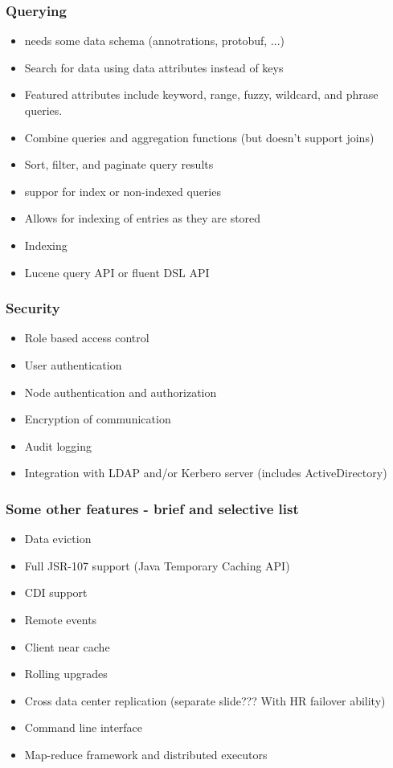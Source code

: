 \documentclass[10pt,utf8]{beamer}
\begin{document}
\begin{frame}
	\frametitle{Querying}
	\begin{itemize}
		\item needs some data schema (annotrations, protobuf, ...)
	 \item Search for data using data attributes instead of keys
	 \item Featured attributes include keyword, range, fuzzy, wildcard, and phrase queries.
	 \item Combine queries and aggregation functions (but doesn't support joins)
	 \item Sort, filter, and paginate query results
	 \item suppor for index or non-indexed queries
	 \item Allows for indexing of entries as they are stored
	 \item Indexing
	 \item Lucene query API or fluent DSL API
	\end{itemize}
\end{frame}

\begin{frame}
	\frametitle{Security}
	\begin{itemize}
	 \item Role based access control
	 \item User authentication
	 \item Node authentication and authorization
	 \item Encryption of communication
	 \item Audit logging
	 \item Integration with LDAP and/or Kerbero server (includes ActiveDirectory)
	\end{itemize}
\end{frame}


\begin{frame}
  \frametitle{Some other features - brief and selective list}
  \begin{itemize}
		\item Data eviction
		\item Full JSR-107 support (Java Temporary Caching API)
		\item CDI support
		\item Remote events
		\item Client near cache
		\item Rolling upgrades
		\item Cross data center replication (separate slide??? With HR failover ability)
		\item Command line interface
		\item Map-reduce framework and distributed executors
  \end{itemize}
\end{frame}
\end{document}
